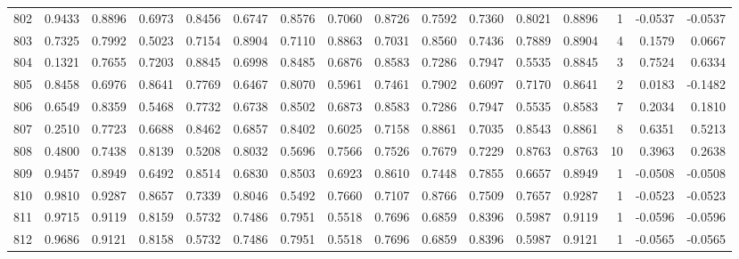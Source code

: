 \begin{tabular}{lrrrrrrrrrrrrrrr}
802 &      0.9433 &  0.8896 &  0.6973 &  0.8456 &  0.6747 &  0.8576 &  0.7060 &  0.8726 &  0.7592 &  0.7360 &   0.8021 &     0.8896 &      1 &                   -0.0537 &                    -0.0537 \\
803 &      0.7325 &  0.7992 &  0.5023 &  0.7154 &  0.8904 &  0.7110 &  0.8863 &  0.7031 &  0.8560 &  0.7436 &   0.7889 &     0.8904 &      4 &                    0.1579 &                     0.0667 \\
804 &      0.1321 &  0.7655 &  0.7203 &  0.8845 &  0.6998 &  0.8485 &  0.6876 &  0.8583 &  0.7286 &  0.7947 &   0.5535 &     0.8845 &      3 &                    0.7524 &                     0.6334 \\
805 &      0.8458 &  0.6976 &  0.8641 &  0.7769 &  0.6467 &  0.8070 &  0.5961 &  0.7461 &  0.7902 &  0.6097 &   0.7170 &     0.8641 &      2 &                    0.0183 &                    -0.1482 \\
806 &      0.6549 &  0.8359 &  0.5468 &  0.7732 &  0.6738 &  0.8502 &  0.6873 &  0.8583 &  0.7286 &  0.7947 &   0.5535 &     0.8583 &      7 &                    0.2034 &                     0.1810 \\
807 &      0.2510 &  0.7723 &  0.6688 &  0.8462 &  0.6857 &  0.8402 &  0.6025 &  0.7158 &  0.8861 &  0.7035 &   0.8543 &     0.8861 &      8 &                    0.6351 &                     0.5213 \\
808 &      0.4800 &  0.7438 &  0.8139 &  0.5208 &  0.8032 &  0.5696 &  0.7566 &  0.7526 &  0.7679 &  0.7229 &   0.8763 &     0.8763 &     10 &                    0.3963 &                     0.2638 \\
809 &      0.9457 &  0.8949 &  0.6492 &  0.8514 &  0.6830 &  0.8503 &  0.6923 &  0.8610 &  0.7448 &  0.7855 &   0.6657 &     0.8949 &      1 &                   -0.0508 &                    -0.0508 \\
810 &      0.9810 &  0.9287 &  0.8657 &  0.7339 &  0.8046 &  0.5492 &  0.7660 &  0.7107 &  0.8766 &  0.7509 &   0.7657 &     0.9287 &      1 &                   -0.0523 &                    -0.0523 \\
811 &      0.9715 &  0.9119 &  0.8159 &  0.5732 &  0.7486 &  0.7951 &  0.5518 &  0.7696 &  0.6859 &  0.8396 &   0.5987 &     0.9119 &      1 &                   -0.0596 &                    -0.0596 \\
812 &      0.9686 &  0.9121 &  0.8158 &  0.5732 &  0.7486 &  0.7951 &  0.5518 &  0.7696 &  0.6859 &  0.8396 &   0.5987 &     0.9121 &      1 &                   -0.0565 &                    -0.0565 \\

\end{tabular}
